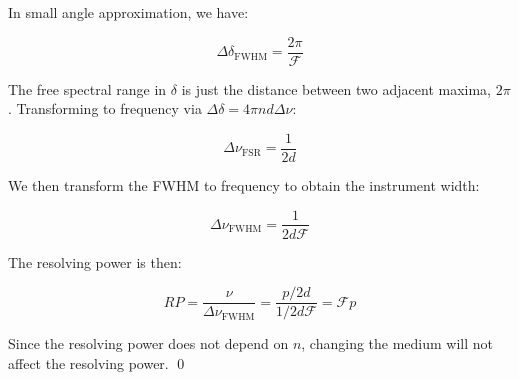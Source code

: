 \documentclass[12pt]{article}
\begin{document}
In small angle approximation, we have:

\begin{equation}
    \Delta \delta_{\text{FWHM}} = \frac{2\pi}{\mathcal{F}}
\end{equation}

The free spectral range in $\delta$ is just the distance between two adjacent maxima, $2\pi$. Transforming to frequency via $\Delta \delta = 4\pi n d \Delta \nu$:

\begin{equation}
    \Delta \nu_{\text{FSR}} = \frac{1}{2d}
\end{equation}

We then transform the FWHM to frequency to obtain the instrument width:

\begin{equation}
    \Delta \nu_{\text{FWHM}} = \frac{1}{2d \mathcal{F}}
\end{equation}

The resolving power is then:

\begin{equation}
    RP = \frac{\nu}{\Delta \nu_{\text{FWHM}}} = \frac{p/2d}{1/2d \mathcal{F}} = \mathcal{F} p
\end{equation}

Since the resolving power does not depend on $n$, changing the medium will not affect the resolving power.
\qed
\end{document}
